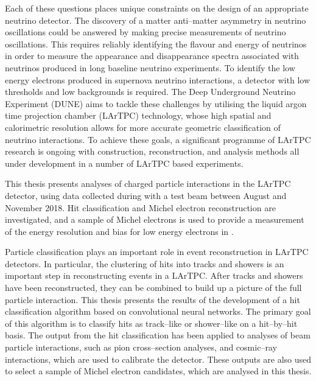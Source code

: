 Each of these questions places unique constraints on the design of an
appropriate neutrino detector. The discovery of a matter anti--matter asymmetry
in neutrino oscillations could be answered by making precise measurements of
neutrino oscillations. This requires reliably identifying the flavour and energy
of neutrinos in order to measure the appearance and disappearance spectra
associated with neutrinos produced in long baseline neutrino experiments. To
identify the low energy electrons produced in supernova neutrino interactions, a
detector with low thresholds and low backgrounds is required. The Deep
Underground Neutrino Experiment (DUNE) aims to tackle these challenges by
utilising the liquid argon time projection chamber (LArTPC) technology, whose
high spatial and calorimetric resolution allows for more accurate geometric
classification of neutrino interactions. To achieve these goals, a significant 
programme of LArTPC research is ongoing with construction, reconstruction, and 
analysis methods all under development in a number of LArTPC based 
experiments\cite{Acciarri:2016smi, Cavanna:2014iqa, Antonello:2015lea, 
Abi:2017aow}. 

This thesis presents analyses of charged particle interactions in the
\protodune{} LArTPC detector, using data collected during with a test beam 
between August and November 2018. Hit classification and Michel electron 
reconstruction are investigated, and a sample of Michel electrons is used to 
provide a measurement of the energy resolution and bias for low energy 
electrons in \protodune{}.

Particle classification plays an important role in event reconstruction in 
LArTPC detectors. In particular, the clustering of hits into tracks and 
showers is an important step in reconstructing events in a LArTPC. After tracks
and showers have been reconstructed, they can be combined to build up a picture
of the full particle interaction. This thesis presents the results of the 
development of a hit classification algorithm based on convolutional neural
networks. The primary goal of this algorithm is to classify hits as 
track--like or shower--like on a hit--by--hit basis. The output from the hit 
classification has been applied to analyses of beam particle interactions, 
such as pion cross--section analyses, and cosmic--ray interactions, which 
are used to calibrate the \protodune{} detector. These outputs are also used 
to select a sample of Michel electron candidates, which are analysed in this 
thesis.

